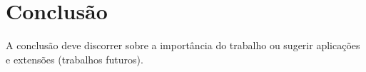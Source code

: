 \section{Conclusão}
 A conclusão deve discorrer sobre a importância do trabalho ou sugerir aplicações e extensões (trabalhos futuros).
 \lipsum[4-4]
 

\begin{comment}
Aqui também é um comentário
\end{comment}